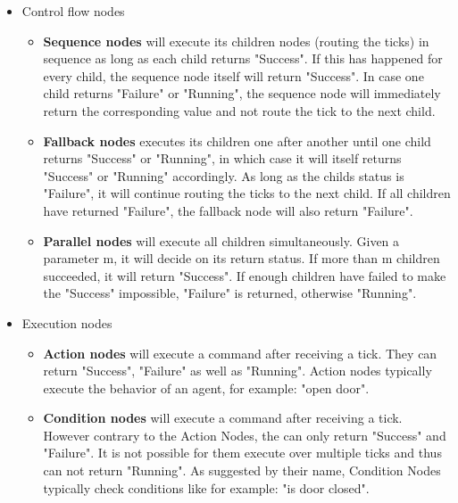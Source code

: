 \begin{itemize}
	\item Control flow nodes
	\begin{itemize}
		\item \textbf{Sequence nodes} will execute its children nodes (routing the ticks) in sequence as long as each child returns "Success". If this has happened for every child, the sequence node itself will return "Success". In case one child returns "Failure" or "Running", the sequence node will immediately return the corresponding value and not route the tick to the next child.
		
		\item \textbf{Fallback nodes} executes its children one after another until one child returns "Success" or "Running", in which case it will itself returns "Success" or "Running" accordingly. As long as the childs status is "Failure", it will continue routing the ticks to the next child. If all children have returned "Failure", the fallback node will also return "Failure".
		
		\item \textbf{Parallel nodes} will execute all children simultaneously. Given a parameter m, it will decide on its return status. If more than m children succeeded, it will return "Success". If enough children have failed to make the "Success" impossible, "Failure" is returned, otherwise "Running".
	\end{itemize}
	\item Execution nodes
	\begin{itemize}
		\item \textbf{Action nodes} will execute a command after receiving a tick. They can return "Success", "Failure" as well as "Running". Action nodes typically execute the behavior of an agent, for example: "open door".
		
		\item \textbf{Condition nodes} will execute a command after receiving a tick. However contrary to the  Action Nodes, the can only return "Success" and "Failure". It is not possible for them execute over multiple ticks and thus can not return "Running". As suggested by their name, Condition Nodes typically check conditions like for example: "is door closed".
	\end{itemize}
\end{itemize}
